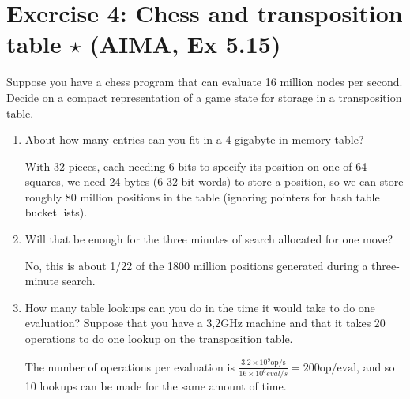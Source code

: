 \documentclass[9pt,a4paper]{extarticle}
\newenvironment{solution}
    {%
    \color{red}
    }
    { 
    \color{black}
    }
\begin{document}
\section*{Exercise 4: Chess and transposition table $\star$ (AIMA, Ex 5.15)}
Suppose you have a chess program that can evaluate 16 million nodes per second.
Decide on a compact representation of a game state for storage in a transposition table.
\begin{enumerate}
    \item About how many entries can you fit in a 4-gigabyte in-memory table?
    \begin{solution}
    With 32 pieces, each needing 6 bits to specify its position on one of 64 squares, we need 24 bytes (6 32-bit words) to store a position, so we can store roughly 80 million positions in the table (ignoring pointers for hash table bucket lists).
    \end{solution}
    \item Will that be enough for the three minutes of search allocated for one move?
    \begin{solution}
    No, this is about 1/22 of the 1800 million positions generated during a three-minute search.
    \end{solution}
    \item How many table lookups can you do in the time it would take to do one evaluation? Suppose that you have a 3,2GHz machine and that it takes 20 operations to do one lookup on the transposition table.
    \begin{solution}
    The number of operations per evaluation is  $\frac{3.2\times 10^9 \text{op/s}}{16\times 10^6{eval/s}} = 200\text{op/eval}$, and so 10 lookups can be made for the same amount of time.
    \end{solution}
\end{enumerate}      
\end{document}
